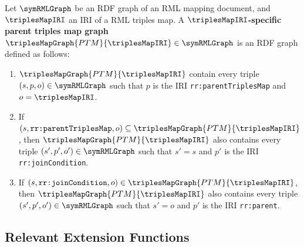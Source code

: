 \begin{definition}
	Let $\symRMLGraph$ be an RDF graph of an RML mapping document, and
	$\triplesMapIRI$ an IRI of a RML triples map.
	A \textbf{$\triplesMapIRI$-specific parent triples map graph
		$\triplesMapGraph{PTM}{\triplesMapIRI} \in \symRMLGraph$} is an RDF graph
	defined as follows:
	\begin{enumerate}
		\item  $\triplesMapGraph{PTM}{\triplesMapIRI}$  contain every triple $(s,p,o) \in \symRMLGraph$
		      such that $p$ is the IRI \texttt{rr:parentTriplesMap} and $o = \triplesMapIRI$.
		\item If $(s,\texttt{rr:parentTriplesMap},o) \subseteq \triplesMapGraph{PTM}{\triplesMapIRI}$, then
		      $\triplesMapGraph{PTM}{\triplesMapIRI}$ also contains every triple $(s',p',o') \in \symRMLGraph$
		      such that $s'=s$ and  $p'$ is the IRI \texttt{rr:joinCondition}.
		\item If $(s,\texttt{rr:joinCondition},o) \in \triplesMapGraph{PTM}{\triplesMapIRI}$, then
		      $\triplesMapGraph{PTM}{\triplesMapIRI}$ also contains every triple $(s',p',o') \in \symRMLGraph$
		      such that $s' = o$ and  $p'$ is the IRI \texttt{rr:parent}.
	\end{enumerate}
\end{definition}


\subsection{Relevant Extension Functions}%
\label{sub:built_in_extend_functions}


